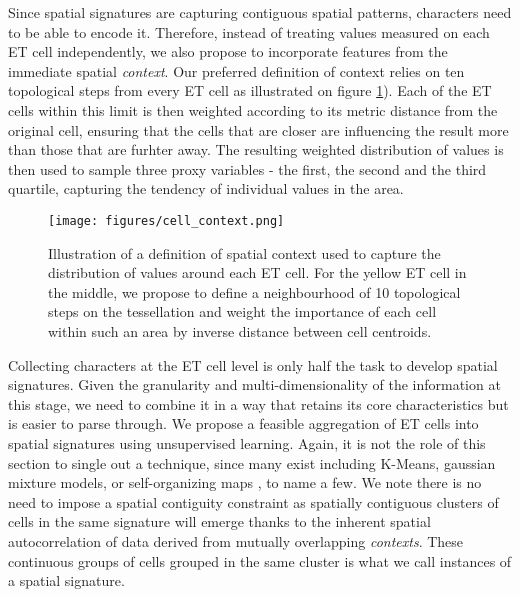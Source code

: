 Since spatial signatures are capturing contiguous spatial patterns, characters need to
be able to encode it. Therefore, instead of treating values measured on each ET cell
independently, we also propose to incorporate features from the immediate spatial \textit{context}.
Our preferred definition of context relies on ten topological steps from every ET cell
as illustrated on figure \ref{fig:context}). Each of the ET
cells within this limit is then weighted according to its metric distance from the
original cell, ensuring that the cells that are closer are influencing the result more
than those that are furhter away. The resulting weighted distribution of values is then
used to sample three proxy variables - the first, the second and the third quartile,
capturing the tendency of individual values in the area.

\begin{figure}
\texttt{[image: figures/cell\_context.png]}
\caption{Illustration of a definition of spatial context used to capture the
distribution of values around each ET cell. For the yellow ET cell in the middle,
we propose to define a neighbourhood of 10 topological steps on the tessellation and
weight the importance of each cell within such an area by inverse distance between cell
centroids.}
\label{fig:context}
\end{figure}


Collecting characters at the ET cell level is only half the task to develop
spatial signatures. Given the granularity and multi-dimensionality of the
information at this stage, we need to combine it in a way that retains its
core characteristics but is easier to parse through.
%
We propose a feasible aggregation of ET cells into
spatial signatures using unsupervised learning. Again, it is not the role of
this section to single out a technique, since many exist including K-Means,
gaussian mixture models, or self-organizing maps \citep{kohonen1990self}, to
name a few. We note there is no need to impose a spatial contiguity constraint
as spatially contiguous clusters of cells in the same signature will emerge
thanks to the inherent spatial autocorrelation of data derived from mutually
overlapping \textit{contexts}.
%
These continuous groups of cells grouped in the same cluster is what we call
instances of a spatial signature.
